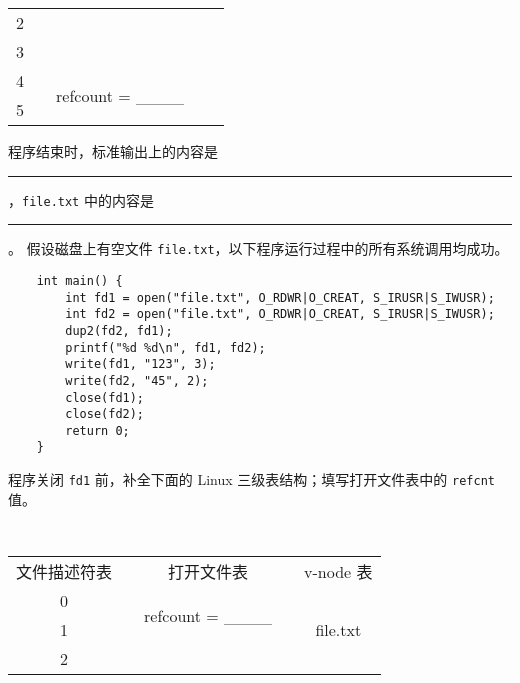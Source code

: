 \begin{problems}
\begin{table}[H]
\begin{tabular}{ccccc}
                \multicolumn{1}{|c|}{2} &  &  & \multicolumn{1}{c|}{} & \multicolumn{1}{c|}{} \\ \cline{1-1}
                \multicolumn{1}{|c|}{3} &  &  & \multicolumn{1}{c|}{} & \multicolumn{1}{c|}{} \\ \cline{1-1} \cline{3-3}
                \multicolumn{1}{|c|}{4} & \multicolumn{1}{c|}{} & \multicolumn{1}{c|}{\multirow{2}{*}{refcount = \_\_\_\_}} & \multicolumn{1}{c|}{} & \multicolumn{1}{c|}{} \\ \cline{1-1}
                \multicolumn{1}{|c|}{5} & \multicolumn{1}{c|}{} & \multicolumn{1}{c|}{} & \multicolumn{1}{c|}{} & \multicolumn{1}{c|}{} \\ \cline{1-1} \cline{3-3} \cline{5-5} 
            \end{tabular}
        \end{table}
        \qn 程序结束时，标准输出上的内容是 \rule{3.5cm}{0.25mm}，\verb|file.txt| 中的内容是 \rule{3.5cm}{0.25mm}。
        \pro 假设磁盘上有空文件 \verb|file.txt|，以下程序运行过程中的所有系统调用均成功。
        \begin{verbatim}
    int main() {
        int fd1 = open("file.txt", O_RDWR|O_CREAT, S_IRUSR|S_IWUSR); 
        int fd2 = open("file.txt", O_RDWR|O_CREAT, S_IRUSR|S_IWUSR); 
        dup2(fd2, fd1);
        printf("%d %d\n", fd1, fd2);
        write(fd1, "123", 3);
        write(fd2, "45", 2);
        close(fd1);
        close(fd2);
        return 0;
    }
        \end{verbatim}
        \qn 程序关闭 \verb|fd1| 前，补全下面的 Linux 三级表结构；填写打开文件表中的 \verb|refcnt| 值。
        \begin{table}[H]
            \tt
            \centering
            \begin{tabular}{ccccc}
                文件描述符表 & {\qquad \qquad \qquad} & 打开文件表 & {\qquad \qquad \qquad} & v-node 表 \\ \cline{1-1} \cline{3-3} \cline{5-5} 
                \multicolumn{1}{|c|}{0} & \multicolumn{1}{c|}{} & \multicolumn{1}{c|}{\multirow{2}{*}{refcount = \_\_\_\_}} & \multicolumn{1}{c|}{} & \multicolumn{1}{c|}{\multirow{6}{*}{file.txt}} \\ \cline{1-1}
                \multicolumn{1}{|c|}{1} & \multicolumn{1}{c|}{} & \multicolumn{1}{c|}{} & \multicolumn{1}{c|}{} & \multicolumn{1}{c|}{} \\ \cline{1-1} \cline{3-3}
                \multicolumn{1}{|c|}{2} &  &  & \multicolumn{1}{c|}{} & \multicolumn{1}{c|}{} \\ \cline{1-1}

\end{tabular}
\end{table}
\end{problems}
